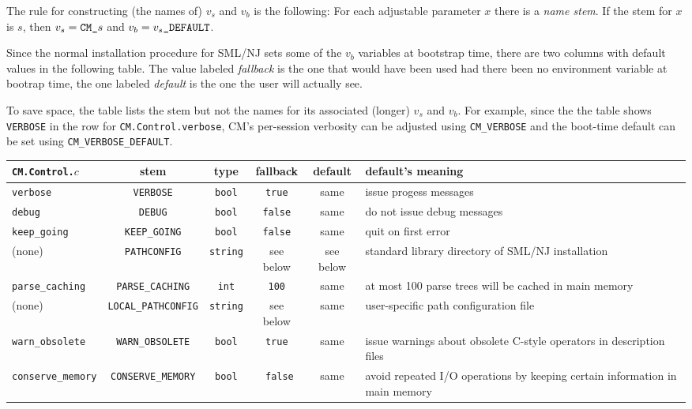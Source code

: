 \documentclass[titlepage,letterpaper]{article}
\begin{document}
The rule for constructing (the names of) $v_s$ and $v_b$ is the
following: For each adjustable parameter $x$ there is a {\em name
stem}.  If the stem for $x$ is $s$, then $v_s = \mbox{\tt CM\_}s$ and
$v_b = v_s\mbox{\tt \_DEFAULT}$.

Since the normal installation procedure for SML/NJ sets some of the
$v_b$ variables at bootstrap time, there are two columns with default
values in the following table.  The value labeled {\em fallback} is
the one that would have been used had there been no environment
variable at bootrap time, the one labeled {\em default} is the one the
user will actually see.

To save space, the table lists the stem but not the names for its
associated (longer) $v_s$ and $v_b$.  For example, since the the table
shows {\tt VERBOSE} in the row for {\tt CM.Control.verbose}, CM's
per-session verbosity can be adjusted using {\tt CM\_VERBOSE} and the
boot-time default can be set using {\tt CM\_VERBOSE\_DEFAULT}.

\begin{center}
\begin{small}
\begin{tabular}{@{}l||c|c|c|c|p{1.5in}@{}}
{\tt CM.Control.}$c$ & stem & type & fallback & default & default's meaning \\
\hline \hline
{\tt verbose} & {\tt VERBOSE} & {\tt bool} & {\tt true} & same & issue
progess messages \\
{\tt debug} & {\tt DEBUG} & {\tt bool} & {\tt false} & same & do not
issue debug messages \\
{\tt keep\_going} & {\tt KEEP\_GOING} & {\tt bool} & {\tt false} &
same & quit on first error \\
(none) & {\tt PATHCONFIG} & {\tt string} & see below & see below &
standard library directory of SML/NJ installation \\
{\tt parse\_caching} & {\tt PARSE\_CACHING} & {\tt int} & {\tt 100} &
same & at most 100 parse trees will be cached in main memory \\
(none) & {\tt LOCAL\_PATHCONFIG} & {\tt string} & see below & same &
user-specific path configuration file \\
{\tt warn\_obsolete} & {\tt WARN\_OBSOLETE} & {\tt bool} & {\tt true}
& same & issue warnings about obsolete C-style operators in
description files \\
{\tt conserve\_memory} & {\tt CONSERVE\_MEMORY} & {\tt bool} & {\tt
false} & same & avoid repeated I/O operations by keeping certain
information in main memory
\end{tabular}
\end{small}
\end{center}
\end{document}
